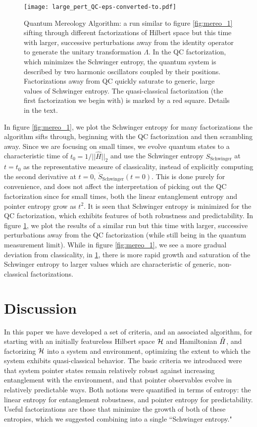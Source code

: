 \documentclass[aps,pra,onecolumn,nofootinbib,11pt,tightenlines]{revtex4-1}
\begin{document}
 \begin{figure}
\texttt{[image: large\_pert\_QC-eps-converted-to.pdf]}
\caption{Quantum Mereology Algorithm: a run similar to figure \ref{fig:mereo_1} sifting through different factorizations of Hilbert space but this time with larger, successive perturbations away from the identity operator to generate the unitary transformation $\Lambda$. In the QC factorization, which minimizes the Schwinger entropy, the quantum system is described by two harmonic oscillators coupled by their positions. Factorizations away from QC quickly saturate to generic, large values of Schwinger entropy. The quasi-classical factorization (the first factorization we begin with) is marked by a red square. Details in the text.}
\label{fig:mereo_2}
\end{figure}

 In figure \ref{fig:mereo_1}, we plot the Schwinger entropy for many factorizations the algorithm sifts through, beginning with the QC factorization and then scrambling away. Since we are focusing on small times, we evolve quantum states to a characteristic time of $t_{0} = 1/||\hat{H}||_{2}$ and use the Schwinger entropy $S_{\mathrm{Schwinger}}$ at $t = t_{0}$ as the representative measure of classicality, instead of explicitly computing the second derivative at $t=0$, $\ddot{S}_{\mathrm{Schwinger}}(t=0)$. This is done purely for convenience, and does not affect the interpretation of picking out the QC factorization since for small times, both the linear entanglement entropy and pointer entropy grow as $t^2$. It is seen that Schwinger entropy is minimized for the QC factorization, which exhibits features of both robustness and predictability. In figure \ref{fig:mereo_2}, we plot the results of a similar run but this time with larger, successive perturbations away from the QC factorization (while still being in the quantum measurement limit). While in figure \ref{fig:mereo_1}, we see a more gradual deviation from classicality, in \ref{fig:mereo_2}, there is more rapid growth and saturation of the Schwinger entropy to larger values which are characteristic of generic, non-classical factorizations.

\section{Discussion}

In this paper we have developed a set of criteria, and an associated algorithm, for starting with an initially featureless Hilbert space $\mathcal{H}$ and Hamiltonian $\hat{H}$, and factorizing $\mathcal{H}$ into a system and environment, optimizing the extent to which the system exhibits quasi-classical behavior. 
The basic criteria we introduced were that system pointer states remain relatively robust against increasing entanglement with the environment, and that pointer observables evolve in relatively predictable ways.
Both notions were quantified in terms of entropy: the linear entropy for entanglement robustness, and pointer entropy for predictability.
Useful factorizations are those that minimize the growth of both of these entropies, which we suggested combining into a single ``Schwinger entropy."
\end{document}
